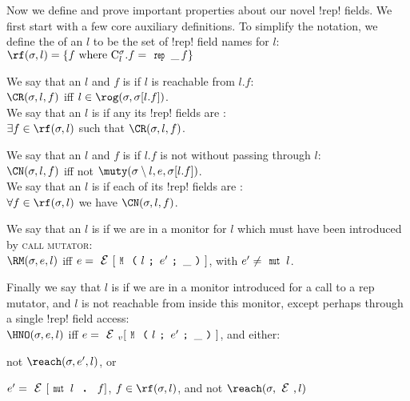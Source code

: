 	\LS
{}
Now we define and prove important properties about our novel \Q!rep! fields. We first start with a few core auxiliary definitions.
To simplify the notation, we define the \rf of an $l$ to be the set of \Q!rep! field names for $l$:\\
\indent $\rf(\s,l) = \{f  \text{ where } \C{l}.f = \field{\Kw{rep}}{\_}{f}\}$
\LS

\noindent We say that an $l$ and $f$ is \CR if $l$ is reachable from $l.f$:\\
\indent $\CR(\s, l, f)$ iff $l \in \rog(\s, \s[l.f])$.\\
\noindent We say that an $l$ is \RCR if any its \Q!rep! fields are \CR:\\
\indent $\exists f \in \rf(\s,l)$ such that $\CR(\s, l, f)$.
\LS

\noindent {}
\LS
\noindent We say that an $l$ and $f$ is \CN if $l.f$ is not \muty without passing through $l$:\\
\indent $\CN(\s, l, f)$ iff not $\muty(\s\setminus l, e, \s[l.f])$.\\
\noindent We say that an $l$ is \RCN if each of its \Q!rep! fields are \CN:\\
\indent $\forall f \in \rf(\s,l)$ we have $\CN(\s, l, f)$.
\LS
%

\noindent We say that an $l$ is \RM if we are in a monitor for $l$ which must have been introduced by \textsc{call mutator}:\\
\indent $\RM(\s, e, l)$ iff $e = \E[\M{l}{e'}{\_}]$, with $e' \neq \Kw{mut}\,l$.
\LS 

\noindent Finally we say that $l$ is \HNO if we are in a monitor introduced for a call to a rep mutator, and $l$ is not reachable from inside this monitor, except perhaps through a single \Q!rep! field access:\\
\indent $\HNO(\s, e, l)$ iff $e = \EV[\M{l}{e'}{\_}]$, and either:
\begin{iitemize}
\item not $\reach(\s, e', l)$, or\SS
\item $e' = \E[\Kw{mut}\,l\D f]$, $f \in \rf(\s,l)$, and not $\reach(\s, \E, l)$
\end{iitemize}

